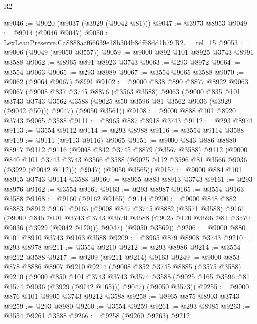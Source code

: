 \begin{lexlean}{R2}
\begin{coremodule}
@9046 := @9020 (@9037 (@3929 (@9042 @81)))
@9047 := @3973 @8953
@9049 := @9014 (@9046 @9047)
@9050 := LexLeanPreserve.Ca8888aaf66639e18b304b8df68dd1b79.R2.__rel_15
@9053 := @9006 (@9049 (@9050 @3557))
@9059 := @9000 @892 @101 @8925 @3743 @8991 @3588
@9062 := @8965 @891 @8923 @3743
@9063 := @293 @8972
@9064 := @3554 @9063
@9065 := @293 @8989
@9067 := @3554 @9065 @3588
@9070 := @9062 (@9064 @9067) @8991
@9102 := @9000
    @838
    @890
    @8877
    @8922
    @9063
    @9067
    (@9008
      @837
      @3745
      @8876
      (@3563 @3588)
      @9063
      (@9000
        @835
        @101
        @3743
        @3743
        @3562
        @3588
        (@9025 @50 @3596 @81 @3562 @9036 (@3929 (@9042 @50)))
        @9047)
      (@9050 @3561))
@9108 := @9000 @888 @101 @8920 @3743 @9065 @3588
@9111 := @8965 @887 @8918 @3743
@9112 := @293 @8974
@9113 := @3554 @9112
@9114 := @293 @8988
@9116 := @3554 @9114 @3588
@9119 := @9111 (@9113 @9116) @9065
@9151 := @9000
    @843
    @886
    @8880
    @8917
    @9112
    @9116
    (@9008
      @842
      @3745
      @8879
      (@3567 @3588)
      @9112
      (@9000
        @840
        @101
        @3743
        @3743
        @3566
        @3588
        (@9025 @112 @3596 @81 @3566 @9036 (@3929 (@9042 @112)))
        @9047)
      (@9050 @3565))
@9157 := @9000 @884 @101 @8915 @3743 @9114 @3588
@9160 := @8965 @883 @8913 @3743
@9161 := @293 @8976
@9162 := @3554 @9161
@9163 := @293 @8987
@9165 := @3554 @9163 @3588
@9168 := @9160 (@9162 @9165) @9114
@9200 := @9000
    @848
    @882
    @8883
    @8912
    @9161
    @9165
    (@9008
      @847
      @3745
      @8882
      (@3571 @3588)
      @9161
      (@9000
        @845
        @101
        @3743
        @3743
        @3570
        @3588
        (@9025 @120 @3596 @81 @3570 @9036 (@3929 (@9042 @120)))
        @9047)
      (@9050 @3569))
@9206 := @9000 @880 @101 @8910 @3743 @9163 @3588
@9209 := @8965 @879 @8908 @3743
@9210 := @293 @8978
@9211 := @3554 @9210
@9212 := @293 @8986
@9214 := @3554 @9212 @3588
@9217 := @9209 (@9211 @9214) @9163
@9249 := @9000
    @853
    @878
    @8886
    @8907
    @9210
    @9214
    (@9008
      @852
      @3745
      @8885
      (@3575 @3588)
      @9210
      (@9000
        @850
        @101
        @3743
        @3743
        @3574
        @3588
        (@9025 @165 @3596 @81 @3574 @9036 (@3929 (@9042 @165)))
        @9047)
      (@9050 @3573))
@9255 := @9000 @876 @101 @8905 @3743 @9212 @3588
@9258 := @8965 @875 @8903 @3743
@9259 := @293 @8980
@9260 := @3554 @9259
@9261 := @293 @8985
@9263 := @3554 @9261 @3588
@9266 := @9258 (@9260 @9263) @9212

\end{coremodule}
\end{lexlean}
